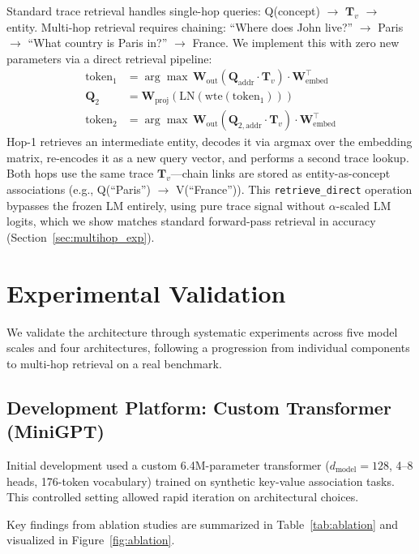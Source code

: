 \documentclass[11pt,a4paper]{article}
\begin{document}
Standard trace retrieval handles single-hop queries: Q(concept) $\to$ $\mathbf{T}_v$ $\to$ entity. Multi-hop retrieval requires chaining: ``Where does John live?'' $\to$ Paris $\to$ ``What country is Paris in?'' $\to$ France. We implement this with zero new parameters via a direct retrieval pipeline:
\begin{align}
  \text{token}_1 &= \arg\max\, \mathbf{W}_{\text{out}}(\mathbf{Q}_{\text{addr}} \cdot \mathbf{T}_v) \cdot \mathbf{W}_{\text{embed}}^\top \label{eq:hop1} \\
  \mathbf{Q}_2 &= \mathbf{W}_{\text{proj}}(\text{LN}(\text{wte}(\text{token}_1))) \label{eq:reencode} \\
  \text{token}_2 &= \arg\max\, \mathbf{W}_{\text{out}}(\mathbf{Q}_{2,\text{addr}} \cdot \mathbf{T}_v) \cdot \mathbf{W}_{\text{embed}}^\top \label{eq:hop2}
\end{align}
Hop-1 retrieves an intermediate entity, decodes it via argmax over the embedding matrix, re-encodes it as a new query vector, and performs a second trace lookup. Both hops use the same trace $\mathbf{T}_v$---chain links are stored as entity-as-concept associations (e.g., Q(``Paris'') $\to$ V(``France'')). This \texttt{retrieve\_direct} operation bypasses the frozen LM entirely, using pure trace signal without $\alpha$-scaled LM logits, which we show matches standard forward-pass retrieval in accuracy (Section~\ref{sec:multihop_exp}).

\section{Experimental Validation}

We validate the architecture through systematic experiments across five model scales and four architectures, following a progression from individual components to multi-hop retrieval on a real benchmark.

\subsection{Development Platform: Custom Transformer (MiniGPT)}

Initial development used a custom 6.4M-parameter transformer ($d_{\text{model}}{=}128$, 4--8 heads, 176-token vocabulary) trained on synthetic key-value association tasks. This controlled setting allowed rapid iteration on architectural choices.

Key findings from ablation studies are summarized in Table~\ref{tab:ablation} and visualized in Figure~\ref{fig:ablation}.
\end{document}
